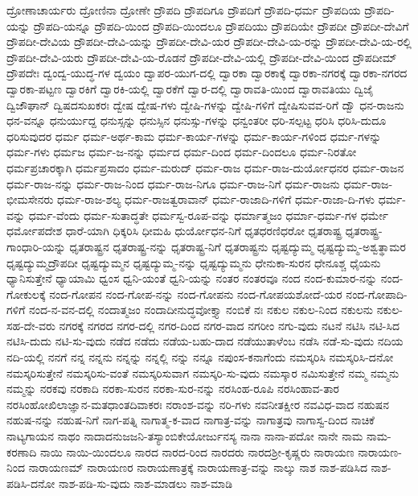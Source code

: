 ದ್ರೋಣಾಚಾರ್ಯರು
ದ್ರೋಣಿನಾ
ದ್ರೋಣೇ
ದ್ರೌಪದಿ
ದ್ರೌಪದಿಗೂ
ದ್ರೌಪದಿಗೆ
ದ್ರೌಪದಿ-ಧರ್ಮ
ದ್ರೌಪದಿಯ
ದ್ರೌಪದಿ-ಯನ್ನು
ದ್ರೌಪದಿ-ಯನ್ನೂ
ದ್ರೌಪದಿ-ಯಿಂದ
ದ್ರೌಪದಿ-ಯಿಂದಲೂ
ದ್ರೌಪದಿಯು
ದ್ರೌಪದಿಯೇ
ದ್ರೌಪದೀ
ದ್ರೌಪದೀ-ದೇವಿಗೆ
ದ್ರೌಪದೀ-ದೇವಿಯ
ದ್ರೌಪದೀ-ದೇವಿ-ಯನ್ನು
ದ್ರೌಪದೀ-ದೇವಿ-ಯರ
ದ್ರೌಪದೀ-ದೇವಿ-ಯ-ರನ್ನು
ದ್ರೌಪದೀ-ದೇವಿ-ಯ-ರಲ್ಲಿ
ದ್ರೌಪದೀ-ದೇವಿ-ಯರು
ದ್ರೌಪದೀ-ದೇವಿ-ಯ-ರೊಡನೆ
ದ್ರೌಪದೀ-ದೇವಿ-ಯಲ್ಲಿ
ದ್ರೌಪದೀ-ದೇವಿ-ಯಿಂದ
ದ್ರೌಪದೀಮ್
ದ್ರೌಪದೇಃ
ದ್ವಂದ್ವ-ಯುದ್ಧ-ಗಳ
ದ್ವಯಂ
ದ್ವಾಪರ-ಯುಗ-ದಲ್ಲಿ
ದ್ವಾರಕಾ
ದ್ವಾರಕಾಕ್ಕೆ
ದ್ವಾರಕಾ-ನಗರಕ್ಕೆ
ದ್ವಾರಕಾ-ನಗರದ
ದ್ವಾರಕಾ-ಪಟ್ಟಣ
ದ್ವಾರಕಿಗೆ
ದ್ವಾರಕಿ-ಯಲ್ಲಿ
ದ್ವಾರಕೆಗೆ
ದ್ವಾರ-ದಲ್ಲಿ
ದ್ವಾರಾವತಿ-ಯಿಂದ
ದ್ವಾರಾವತಿಯು
ದ್ವಿಜೈ
ದ್ವಿಜೌಘಾನ್
ದ್ವಿಷದಸುಖಕರಃ
ದ್ವೇಷ
ದ್ವೇಷ-ಗಳು
ದ್ವೇಷಿ-ಗಳನ್ನು
ದ್ವೇಷಿ-ಗಳಿಗೆ
ದ್ವೇಷಿಸುವವ-ರಿಗೆ
ದ್ವೌ
ಧನ-ರಾಜನು
ಧನ-ವನ್ನೂ
ಧನುರ್ಯುದ್ದ
ಧನುಸ್ಸನ್ನು
ಧನುಸ್ಸಿನ
ಧನುಸ್ಸು-ಗಳನ್ನು
ಧನ್ವಂತರೀ
ಧರಿ-ಸಲ್ಪಟ್ಟ
ಧರಿಸಿ
ಧರಿಸಿ-ದುದೂ
ಧರಿಸುವುದರ
ಧರ್ಮ
ಧರ್ಮ-ಅರ್ಥ-ಕಾಮ
ಧರ್ಮ-ಕಾರ್ಯ-ಗಳನ್ನು
ಧರ್ಮ-ಕಾರ್ಯ-ಗಳಿಂದ
ಧರ್ಮ-ಗಳನ್ನು
ಧರ್ಮ-ಗಳು
ಧರ್ಮಜ
ಧರ್ಮ-ಜ-ನನ್ನು
ಧರ್ಮದ
ಧರ್ಮ-ದಿಂದ
ಧರ್ಮ-ದಿಂದಲೂ
ಧರ್ಮ-ನಿರತೋ
ಧರ್ಮಪ್ರಚಾರಕ್ಕಾಗಿ
ಧರ್ಮಪ್ರಸಾದಂ
ಧರ್ಮ-ಮರುದ್
ಧರ್ಮ-ರಾಜ
ಧರ್ಮ-ರಾಜ-ದುರ್ಯೋಧನರ
ಧರ್ಮ-ರಾಜನ
ಧರ್ಮ-ರಾಜ-ನನ್ನು
ಧರ್ಮ-ರಾಜ-ನಿಂದ
ಧರ್ಮ-ರಾಜ-ನಿಗೂ
ಧರ್ಮ-ರಾಜ-ನಿಗೆ
ಧರ್ಮ-ರಾಜನು
ಧರ್ಮ-ರಾಜ-ಭೀಮಸೇನರು
ಧರ್ಮ-ರಾಜ-ಶಲ್ಯ
ಧರ್ಮ-ರಾಜತ್ವರಾವಾನ್
ಧರ್ಮ-ರಾಜಾದಿ-ಗಳಿಗೆ
ಧರ್ಮ-ರಾಜಾ-ದಿ-ಗಳು
ಧರ್ಮ-ವನ್ನು
ಧರ್ಮ-ವೆಂದು
ಧರ್ಮ-ಸುತಾದ್ಧತೇ
ಧರ್ಮಸ್ವ-ರೂಪ-ವನ್ನು
ಧರ್ಮಾತ್ಮಜಂ
ಧರ್ಮಾ-ಧರ್ಮ-ಗಳ
ಧರ್ಮೇ
ಧರ್ಮೋಪದೇಶ
ಧಾರೆ-ಯಾಗಿ
ಧಿಕ್ಕರಿಸಿ
ಧೀಮಹಿ
ಧುರ್ಯೋಧನ-ನಿಗೆ
ಧೃತಧರಣಿಧರೋ
ಧೃತರಾಷ್ಟ್ರ
ಧೃತರಾಷ್ಟ್ರ-ಗಾಂಧಾರಿ-ಯನ್ನು
ಧೃತರಾಷ್ಟ್ರನ
ಧೃತರಾಷ್ಟ್ರ-ನನ್ನು
ಧೃತರಾಷ್ಟ್ರ-ನಿಗೆ
ಧೃತರಾಷ್ಟ್ರನು
ಧೃಷ್ಟದ್ಯುಮ್ಮ
ಧೃಷ್ಟದ್ಯುಮ್ಮ-ಅಶ್ವತ್ಥಾಮರ
ಧೃಷ್ಟದ್ಯುಮ್ಮದ್ರೌಪದೀ
ಧೃಷ್ಟದ್ಯುಮ್ಮನ
ಧೃಷ್ಟದ್ಯುಮ್ಮ-ನನ್ನು
ಧೃಷ್ಟದ್ಯುಮ್ಮನು
ಧೇನುಕಾ-ಸುರನ
ಧೇನೂಶ್ಚ
ಧೈಯನು
ಧ್ಯಾನಿಸುತ್ತೇನೆ
ಧ್ಯಾಯಾಮಿ
ಧ್ವಂಸ
ಧ್ವನಿ-ಯಂತೆ
ಧ್ವನಿ-ಯನ್ನು
ನಂತರ
ನಂತರವೂ
ನಂದ
ನಂದ-ಕುಮಾರ-ನನ್ನು
ನಂದ-ಗೋಕುಲಕ್ಕೆ
ನಂದ-ಗೋಪನ
ನಂದ-ಗೋಪ-ನನ್ನು
ನಂದ-ಗೋಪನು
ನಂದ-ಗೋಪಯಶೋದೆ-ಯರ
ನಂದ-ಗೋಪಾದಿ-ಗಳಿಗೆ
ನಂದ-ನ-ವನ-ದಲ್ಲಿ
ನಂದಾತ್ಮಜಂ
ನಂದಾದೀನುದ್ಧವೋಕ್ತ್ಯಾ
ನಂಬಿಕೆ
ನಃ
ನಕುಲ
ನಕುಲ-ನಿಂದ
ನಕುಲನು
ನಕುಲ-ಸಹ-ದೇ-ವರು
ನಗರಕ್ಕೆ
ನಗರದ
ನಗರ-ದಲ್ಲಿ
ನಗರ-ದಿಂದ
ನಗರ-ವಾದ
ನಗರೀಂ
ನಗು-ವುದು
ನಟನೆ
ನಟಿಸಿ
ನಟಿ-ಸಿದ
ನಟಿಸಿ-ದುದು
ನಟಿ-ಸು-ವುದು
ನಡೆದ
ನಡೆದು
ನಡೆಯ-ಬಹು-ದಾದ
ನಡೆಯುತಾಳೆಂಬ
ನಡೆಸಿ
ನಡೆ-ಸು-ವುದು
ನದಿಯ
ನದಿ-ಯಲ್ಲಿ
ನನಗೆ
ನನ್ನ
ನನ್ನನು
ನನ್ನನ್ನು
ನನ್ನಲ್ಲಿ
ನನ್ನು
ನನ್ನೂ
ನಪುಂಸ-ಕನಾಗೆಂದು
ನಮಸ್ಕರಿಸಿ
ನಮಸ್ಕರಿಸಿ-ದನೋ
ನಮಸ್ಕರಿಸುತ್ತೇನೆ
ನಮಸ್ಕರಿಸು-ವಂತೆ
ನಮಸ್ಕರಿಸುವಾಗ
ನಮಸ್ಕರಿ-ಸು-ವುದು
ನಮಸ್ಕಾರ
ನಮಿಸುತ್ತೇನೆ
ನಮ್ಮ
ನಮ್ಮನು
ನಮ್ಮನ್ನು
ನರಕವು
ನರಕಾದಿ
ನರಕಾ-ಸುರನ
ನರಕಾ-ಸುರ-ನನ್ನು
ನರಸಿಂಹ-ರೂಪಿ
ನರಸಿಂಹಾವ-ತಾರ
ನರಸಿಂಹೋಖಿಲಾಜ್ಞಾನ-ಮತಧಾಂತದಿವಾಕರಃ
ನರಾಂಶ-ವನ್ನು
ನರಿ-ಗಳು
ನವನೀತಕ್ಷೀರ
ನವವಿಧ-ವಾದ
ನಹುಷನ
ನಹುಷ-ನನ್ನು
ನಹುಷ-ನಿಗೆ
ನಾಗ-ಪತ್ನಿ
ನಾಗಾತ್ಮ-ಕ-ವಾದ
ನಾಗಾತ್ರ-ವನ್ನು
ನಾಗಾತ್ರವು
ನಾಗಾಸ್ವ-ದಿಂದ
ನಾಚಿಕೆ
ನಾಟ್ಯಗಾಯನ
ನಾಥಂ
ನಾದಾದನುಜಜನಿ-ತಸ್ಯಾಂಬಿಕೇಯೋರ್ಜುನಸ್ಯ
ನಾನಾ
ನಾನಾ-ಪದೋ
ನಾನೇ
ನಾಮ
ನಾಮ-ಕರಣಾದಿ
ನಾಯಿ
ನಾಯಿ-ಯಿಂದಲೂ
ನಾರದ
ನಾರದ-ರಿಂದ
ನಾರದರು
ನಾರದಶ್ರೀ-ಕೃಷ್ಣರು
ನಾರಾಯಣ
ನಾರಾಯಣ-ನಿಂದ
ನಾರಾಯಣಮ್
ನಾರಾಯಣರ
ನಾರಾಯಣಾತ್ರಕ್ಕೆ
ನಾರಾಯಣಾತ್ರ-ವನ್ನು
ನಾಲ್ಕು
ನಾಶ
ನಾಶ-ಪಡಿಸಿದ
ನಾಶ-ಪಡಿಸಿ-ದನೋ
ನಾಶ-ಪಡಿ-ಸು-ವುದು
ನಾಶ-ಮಾಡಲು
ನಾಶ-ಮಾಡಿ
